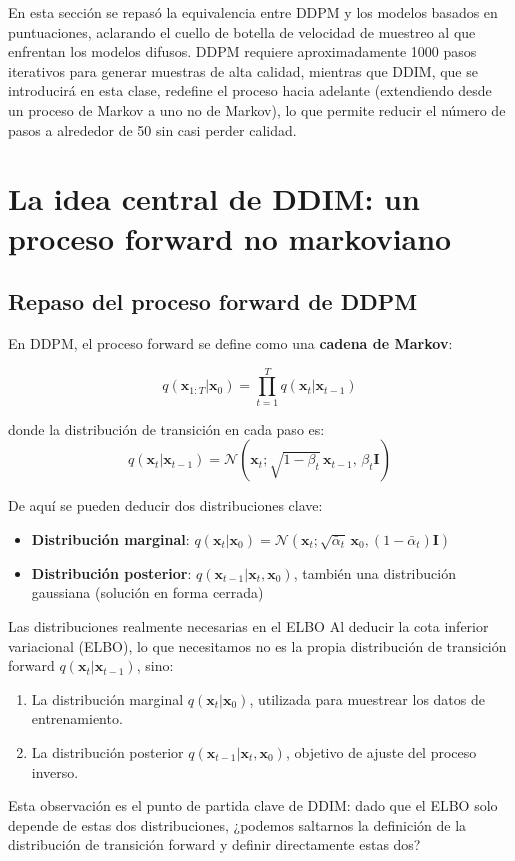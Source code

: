 \documentclass[a4paper]{article}
\begin{document}
En esta sección se repasó la equivalencia entre DDPM y los modelos basados en puntuaciones, aclarando el cuello de botella de velocidad de muestreo al que enfrentan los modelos difusos. DDPM requiere aproximadamente 1000 pasos iterativos para generar muestras de alta calidad, mientras que DDIM, que se introducirá en esta clase, redefine el proceso hacia adelante (extendiendo desde un proceso de Markov a uno no de Markov), lo que permite reducir el número de pasos a alrededor de 50 sin casi perder calidad.

\section{La idea central de DDIM: un proceso forward no markoviano}

\subsection{Repaso del proceso forward de DDPM}

En DDPM, el proceso forward se define como una \textbf{cadena de Markov}:

$$
q(\mathbf{x}_{1:T} | \mathbf{x}_0) = \prod_{t=1}^{T} q(\mathbf{x}_t | \mathbf{x}_{t-1})
$$

donde la distribución de transición en cada paso es:
$$
q(\mathbf{x}_t | \mathbf{x}_{t-1}) = \mathcal{N}(\mathbf{x}_t; \sqrt{1-\beta_t}\,\mathbf{x}_{t-1},\, \beta_t \mathbf{I})
$$

De aquí se pueden deducir dos distribuciones clave:
\begin{itemize}
    \item \textbf{Distribución marginal}: $q(\mathbf{x}_t | \mathbf{x}_0) = \mathcal{N}(\mathbf{x}_t; \sqrt{\bar{\alpha}_t}\,\mathbf{x}_0, (1-\bar{\alpha}_t)\mathbf{I})$
    \item \textbf{Distribución posterior}: $q(\mathbf{x}_{t-1} | \mathbf{x}_t, \mathbf{x}_0)$, también una distribución gaussiana (solución en forma cerrada)
\end{itemize}

\begin{importantbox}{Las distribuciones realmente necesarias en el ELBO}
Al deducir la cota inferior variacional (ELBO), lo que necesitamos no es la propia distribución de transición forward $q(\mathbf{x}_t|\mathbf{x}_{t-1})$, sino:
\begin{enumerate}
    \item La distribución marginal $q(\mathbf{x}_t | \mathbf{x}_0)$, utilizada para muestrear los datos de entrenamiento.
    \item La distribución posterior $q(\mathbf{x}_{t-1} | \mathbf{x}_t, \mathbf{x}_0)$, objetivo de ajuste del proceso inverso.
\end{enumerate}
Esta observación es el punto de partida clave de DDIM: dado que el ELBO solo depende de estas dos distribuciones, ¿podemos saltarnos la definición de la distribución de transición forward y definir directamente estas dos?
\end{importantbox}
\end{document}
